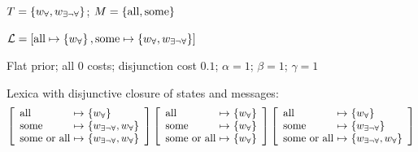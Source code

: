 \documentclass{article}
\begin{document}
\newcommand{\scalarlex}[3]{
  \left[
    \begin{array}[c]{l@{ \ \mapsto \ } l}
      \mAll & \set{#1} \\
      \mSome & \set{#2} \\
      \mSomevAll & \set{#3} \\
    \end{array}
  \right]}

\begin{examples}
\item
  \begin{examples}
  \item $T = \left\{ w_{\forall}, w_{\exists\neg\forall} \right\}$; $M = \left\{ \text{all}, \text{some} \right\}$
  \item $\mathcal{L} = [\text{all} \mapsto \left\{ w_{\forall} \right\}, \text{some} \mapsto \left\{ w_{\forall},w_{\exists\neg\forall} \right\}]$
  \item Flat prior; all $0$ costs; disjunction cost $0.1$; $\alpha = 1$; $\beta = 1$; $\gamma = 1$  
  \item Lexica with disjunctive closure of states and messages:
    \setlength{\arraycolsep}{2pt}
    \[
    \scalarlex{\wALL}{\wSOMENOTALL,\wALL}{\wSOMENOTALL, \wALL}
    \hfill
    \scalarlex{\wALL}{\wALL}{\wALL}
    \hfill
    \scalarlex{\wALL}{\wSOMENOTALL}{\wSOMENOTALL, \wALL} 
    \]
  \end{examples}
\end{examples}
\end{document}
